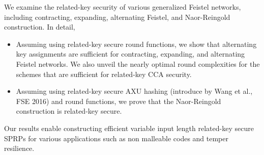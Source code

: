 We examine the related-key security of various generalized Feistel networks, including contracting, expanding, alternating Feistel, and Naor-Reingold construction. In detail,
\begin{itemize}
	\item Assuming using related-key secure round functions, we show that alternating key assignments are sufficient for contracting, expanding, and alternating Feistel networks. We also unveil the nearly optimal round complexities for the schemes that are sufficient for related-key CCA security.
	\item Assuming using related-key secure AXU hashing (introduce by Wang et al., FSE 2016) and round functions, we prove that the Naor-Reingold construction is related-key secure.
\end{itemize}
Our results enable constructing efficient variable input length related-key secure SPRPs for various applications such as non malleable codes and temper resilience.